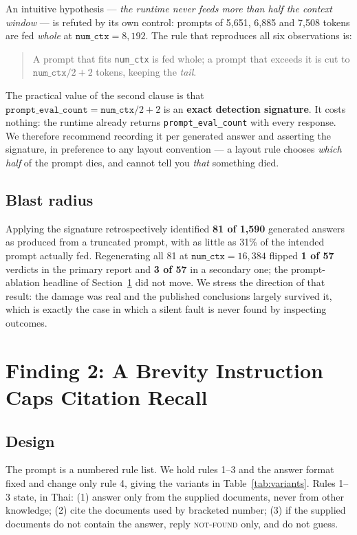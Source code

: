 \documentclass[conference]{IEEEtran}
\begin{document}
An intuitive hypothesis --- \emph{the runtime never feeds more than half the
context window} --- is refuted by its own control: prompts of 5{,}651, 6{,}885 and
7{,}508 tokens are fed \emph{whole} at $\texttt{num\_ctx}=8{,}192$. The rule that
reproduces all six observations is:

\begin{quote}
A prompt that fits \texttt{num\_ctx} is fed whole; a prompt that exceeds it is
cut to $\texttt{num\_ctx}/2 + 2$ tokens, keeping the \emph{tail}.
\end{quote}

The practical value of the second clause is that
$\texttt{prompt\_eval\_count} = \texttt{num\_ctx}/2 + 2$ is an \textbf{exact
detection signature}. It costs nothing: the runtime already returns
\texttt{prompt\_eval\_count} with every response. We therefore recommend
recording it per generated answer and asserting the signature, in preference to
any layout convention --- a layout rule chooses \emph{which half} of the prompt
dies, and cannot tell you \emph{that} something died.

\subsection{Blast radius}

Applying the signature retrospectively identified \textbf{81 of 1{,}590}
generated answers as produced from a truncated prompt, with as little as 31\% of
the intended prompt actually fed. Regenerating all 81 at
$\texttt{num\_ctx}=16{,}384$ flipped \textbf{1 of 57} verdicts in the primary
report and \textbf{3 of 57} in a secondary one; the prompt-ablation headline of
Section~\ref{sec:ablation} did not move. We stress the direction of that result:
the damage was real and the published conclusions largely survived it, which is
exactly the case in which a silent fault is never found by inspecting outcomes.

\section{Finding 2: A Brevity Instruction Caps Citation Recall}
\label{sec:ablation}

\subsection{Design}

The prompt is a numbered rule list. We hold rules 1--3 and the answer format
fixed and change only rule 4, giving the variants in Table~\ref{tab:variants}.
Rules 1--3 state, in Thai: (1) answer only from the supplied documents, never
from other knowledge; (2) cite the documents used by bracketed number; (3) if the
supplied documents do not contain the answer, reply \textsc{not-found} only, and
do not guess.
\end{document}
